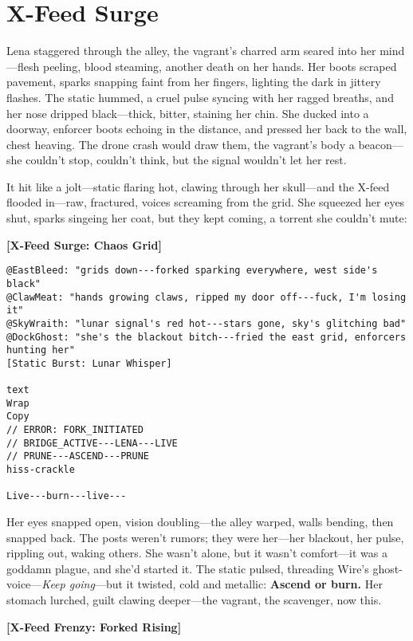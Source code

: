 \documentclass[12pt]{book}
\begin{document}
\section{X-Feed Surge}

Lena staggered through the alley, the vagrant’s charred arm seared into her mind---flesh peeling, blood steaming, another death on her hands. Her boots scraped pavement, sparks snapping faint from her fingers, lighting the dark in jittery flashes. The static hummed, a cruel pulse syncing with her ragged breaths, and her nose dripped black---thick, bitter, staining her chin. She ducked into a doorway, enforcer boots echoing in the distance, and pressed her back to the wall, chest heaving. The drone crash would draw them, the vagrant’s body a beacon---she couldn’t stop, couldn’t think, but the signal wouldn’t let her rest.

It hit like a jolt---static flaring hot, clawing through her skull---and the X-feed flooded in---raw, fractured, voices screaming from the grid. She squeezed her eyes shut, sparks singeing her coat, but they kept coming, a torrent she couldn’t mute:

\bigskip
\noindent\textbf{[X-Feed Surge: Chaos Grid]}

\begin{verbatim}
@EastBleed: "grids down---forked sparking everywhere, west side's black"
@ClawMeat: "hands growing claws, ripped my door off---fuck, I'm losing it"
@SkyWraith: "lunar signal's red hot---stars gone, sky's glitching bad"
@DockGhost: "she's the blackout bitch---fried the east grid, enforcers hunting her"
[Static Burst: Lunar Whisper]

text
Wrap
Copy
// ERROR: FORK_INITIATED  
// BRIDGE_ACTIVE---LENA---LIVE  
// PRUNE---ASCEND---PRUNE  
hiss-crackle

Live---burn---live---
\end{verbatim}
\bigskip

Her eyes snapped open, vision doubling---the alley warped, walls bending, then snapped back. The posts weren’t rumors; they were her---her blackout, her pulse, rippling out, waking others. She wasn’t alone, but it wasn’t comfort---it was a goddamn plague, and she’d started it. The static pulsed, threading Wire’s ghost-voice---\textit{Keep going}---but it twisted, cold and metallic: \textbf{Ascend or burn.} Her stomach lurched, guilt clawing deeper---the vagrant, the scavenger, now this.

\bigskip
\noindent\textbf{[X-Feed Frenzy: Forked Rising]}
\end{document}
